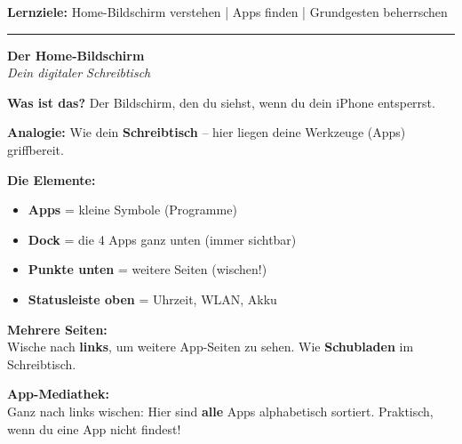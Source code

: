 \documentclass[a4paper,landscape,8pt]{extarticle}
\begin{document}

 \hfill
{\footnotesize\textbf{Lernziele:} Home-Bildschirm verstehen | Apps finden | Grundgesten beherrschen}

\vspace{1mm}
\hrule
\vspace{1mm}

\begin{minipage}[t]{0.32\linewidth}
\begin{center}
\colorbox{homeblue!10}{%
\begin{minipage}{0.95\linewidth}
\vspace{2mm}
\begin{center}
{\Large\bfseries\textcolor{homeblue}{Der Home-Bildschirm}}\\[1pt]
{\footnotesize\itshape Dein digitaler Schreibtisch}
\end{center}
\vspace{2mm}
\end{minipage}%
}
\end{center}

\vspace{1mm}

\textbf{Was ist das?} Der Bildschirm, den du siehst, wenn du dein iPhone entsperrst.

\textbf{Analogie:} Wie dein \textbf{Schreibtisch} -- hier liegen deine Werkzeuge (Apps) griffbereit.

\textbf{Die Elemente:}
\begin{itemize}
\item \textbf{Apps} = kleine Symbole (Programme)
\item \textbf{Dock} = die 4 Apps ganz unten (immer sichtbar)
\item \textbf{Punkte unten} = weitere Seiten (wischen!)
\item \textbf{Statusleiste oben} = Uhrzeit, WLAN, Akku
\end{itemize}

\textbf{Mehrere Seiten:}\\
Wische nach \textbf{links}, um weitere App-Seiten zu sehen. Wie \textbf{Schubladen} im Schreibtisch.

\textbf{App-Mediathek:}\\
Ganz nach links wischen: Hier sind \textbf{alle} Apps alphabetisch sortiert. Praktisch, wenn du eine App nicht findest!

\end{minipage}%
\end{document}
